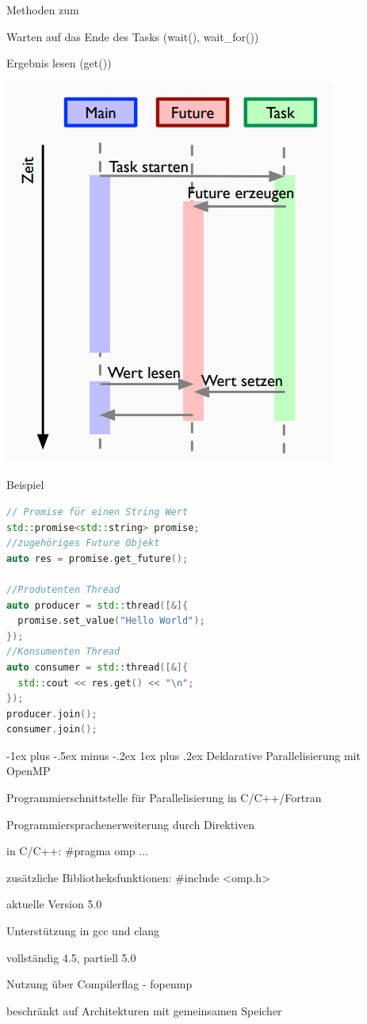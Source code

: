 \documentclass[10pt]{article}
\makeatletter
\renewcommand{\subsubsection}{\@startsection{subsubsection}{3}{0mm}%
                                {-1ex plus -.5ex minus -.2ex}%
                                {1ex plus .2ex}%
                                {\normalfont\small\bfseries}}
\makeatother
\begin{document}
  \begin{itemize*}
    \item Methoden zum
    \begin{itemize*}
      \item Warten auf das Ende des Tasks (wait(), wait\_for())
      \item Ergebnis lesen (get())
    \end{itemize*}
  \end{itemize*}
  \begin{center}
    \includegraphics[width=0.4\linewidth]{Assets/Programmierparadigmen-future-task}
  \end{center}
  
  Beispiel
  \begin{lstlisting}[language=C++]
// Promise für einen String Wert
std::promise<std::string> promise;
//zugehöriges Future Objekt
auto res = promise.get_future();

//Produtenten Thread
auto producer = std::thread([&]{
  promise.set_value("Hello World");
});
//Konsumenten Thread
auto consumer = std::thread([&]{
  std::cout << res.get() << "\n";
});
producer.join();
consumer.join();
\end{lstlisting}
  
  \subsubsection{Deklarative Parallelisierung mit OpenMP}
  \begin{itemize*}
    \item Programmierschnittstelle für Parallelisierung in C/C++/Fortran
    \item Programmiersprachenerweiterung durch Direktiven
    \item in C/C++: \#pragma omp ...
    \item zusätzliche Bibliotheksfunktionen: \#include <omp.h>
    \item aktuelle Version 5.0
    \item Unterstützung in gcc und clang
    \begin{itemize*}
      \item vollständig 4.5, partiell 5.0
      \item Nutzung über Compilerflag - fopenmp
    \end{itemize*}
    \item beschränkt auf Architekturen mit gemeinsamen Speicher
  \end{itemize*}
  
\end{document}
